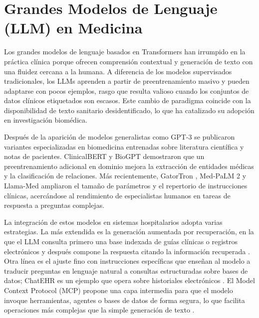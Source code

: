 \section{Grandes Modelos de Lenguaje (LLM) en Medicina}

Los grandes modelos de lenguaje basados en Transformers han irrumpido en la práctica clínica porque ofrecen comprensión contextual y generación de texto con una fluidez cercana a la humana. A diferencia de los modelos supervisados tradicionales, los LLMs aprenden a partir de preentrenamiento masivo y pueden adaptarse con pocos ejemplos, rasgo que resulta valioso cuando los conjuntos de datos clínicos etiquetados son escasos. Este cambio de paradigma coincide con la disponibilidad de texto sanitario desidentificado, lo que ha catalizado su adopción en investigación biomédica.


Después de la aparición de modelos generalistas como GPT-3 \cite{Brown2020GPT3} se publicaron variantes especializadas en biomedicina entrenadas sobre literatura científica y notas de pacientes. ClinicalBERT \cite{Boag2020_ClinicalBERT} y BioGPT \cite{Lee2020_BioBERT} demostraron que un preentrenamiento adicional en dominio mejora la extracción de entidades médicas y la clasificación de relaciones. Más recientemente, GatorTron \cite{Yang2022_GatorTron}, Med-PaLM 2 \cite{Singhal2023_MedPaLM2} y Llama-Med \cite{Xie2024_MeLLaMA} ampliaron el tamaño de parámetros y el repertorio de instrucciones clínicas, acercándose al rendimiento de especialistas humanos en tareas de respuesta a preguntas complejas.

La integración de estos modelos en sistemas hospitalarios adopta varias estrategias. La más extendida es la generación aumentada por recuperación, en la que el LLM consulta primero una base indexada de guías clínicas o registros electrónicos y después compone la respuesta citando la información recuperada \cite{RAGSurvey2023}. Otra línea es el ajuste fino con instrucciones específicas que enseñan al modelo a traducir preguntas en lenguaje natural a consultas estructuradas sobre bases de datos; ChatEHR es un ejemplo que opera sobre historiales electrónicos \cite{Stanford2025_ChatEHR}. El Model Context Protocol (MCP) propone una capa intermedia para que el modelo invoque herramientas, agentes o bases de datos de forma segura, lo que facilita operaciones más complejas que la simple generación de texto \cite{AnthropicMCP2024}.

